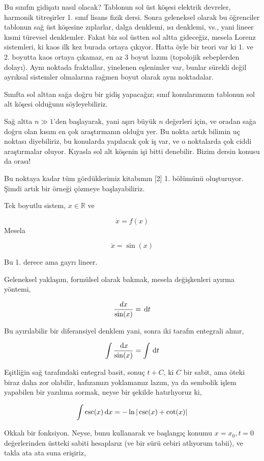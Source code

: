 \documentclass[12pt,fleqn]{article}\usepackage{../../common}
\begin{document}
Bu sınıfın gidişatı nasıl olacak? Tablonun sol üst köşesi elektrik
devreler, harmonik titreşirler 1. sınıf lisans fizik dersi. Sonra
geleneksel olarak bu öğrenciler tablonun sağ üst köşesine zıplarlar, dalga
denklemi, ısı denklemi, vs., yani lineer kısmi türevsel denklemler. Fakat
biz sol üstten sol altta gideceğiz, mesela Lorenz sistemleri, ki kaos ilk
kez burada ortaya çıkıyor. Hatta öyle bir teori var ki 1. ve 2. boyutta
kaos ortaya çıkamaz, en az 3 boyut lazım (topolojik sebeplerden
dolayı). Aynı noktada fraktallar, yinelenen eşlenimler var, bunlar sürekli
değil ayrıksal sistemler olmalarına rağmen boyut olarak aynı noktadalar. 

Sınıfta sol alttan sağa doğru bir gidiş yapacağız; sınıf konularımızın
tablonun sol alt köşesi olduğunu söyleyebiliriz.

Sağ altta $n \gg 1$'den başlayarak, yani aşırı büyük $n$ değerleri için, ve
oradan sağa doğru olan kısım en çok araştırmanın olduğu yer. Bu nokta artık
bilimin uç noktası diyebiliriz, bu konularda yapılacak çok iş var, ve o
noktalarda çok ciddi araştırmalar oluyor. Kıyasla sol alt köşenin işi bitti
denebilir. Bizim dersin konusu da orası!

Bu noktaya kadar tüm gördüklerimiz kitabımın [2] 1. bölümünü
oluşturuyor. Şimdi artık bir örneği çözmeye başlayabiliriz.

Tek boyutlu sistem, $x \in \mathbb{R}$ ve

$$ \dot{x} = f(x) $$
Mesela 

$$ \dot{x} = \sin(x) $$

Bu 1. derece ama gayrı lineer. 

Geleneksel yaklaşım, formülsel olarak bakmak, mesela değişkenleri ayırma
yöntemi, 

$$ \frac{dx}{\sin(x)} = \,\mathrm{d} t $$

Bu ayırılabilir bir diferansiyel denklem yani, sonra iki tarafın entegrali
alınır, 

$$ \int \frac{\,\mathrm{d} x}{\sin(x)} = \int \,\mathrm{d} t $$

Eşitliğin sağ tarafındaki entegral basit, sonuç $t + C$, ki $C$ bir sabit,
ama öteki biraz daha zor olabilir, hafızamızı yoklamamız lazım, ya da
sembolik işlem yapabilen bir yazılıma sormak, neyse bir şekilde
hatırlıyoruz ki,

$$ \int \csc(x) \,\mathrm{d} x = - \ln |\csc (x) + \cot (x)| $$

Okkalı bir fonksiyon. Neyse, bunu kullanarak ve başlangıç konumu
$x=x_0,t=0$ değerlerinden üstteki sabiti hesaplarız (ve bir sürü cebiri
atlıyorum tabii), ve takla ata ata suna erişiriz,
\end{document}
